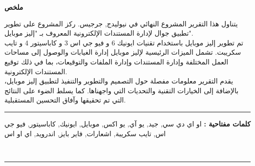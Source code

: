 \begin{center}
  \begin{Arabic}
    \textbf{ملخص}
  \end{Arabic}
\end{center}


\begin{Arabic}
  \par
  يتناول هذا التقرير المشروع النهائي في نيوليدج, جرجيس. ركز المشروع على تطوير تطبيق جوال لإدارة المستندات الإلكترونية المعروف بـ "إليز موبايل".\\
تم تطوير إليز موبايل باستخدام تقنيات ايونيك 6 و فيو جي اس 3 و كاباسيتور 4 و تايب سكريبت.
تشمل الميزات الرئيسية لإليز موبايل إدارة الغيابات والوصول إلى مساحات العمل المختلفة وإدارة المستندات وإدارة الملفات والتوقيعات، بما في ذلك توقيع المستندات الإلكترونية.\\
يقدم التقرير معلومات مفصلة حول التصميم والتطوير والتنفيذ لتطبيق إليز موبايل، بالإضافة إلى الخيارات التقنية والتحديات التي واجهناها. كما يسلط الضوء على النتائج التي تم تحقيقها وآفاق التحسين المستقبلية.
  
\end{Arabic}

\noindent\rule[2pt]{\textwidth}{0.5pt}

\begin{Arabic}

{\textbf{كلمات مفتاحية :}}
او اي دي سي, جيد, يو آي, يو اكس, موبايل, ايونيك, كاباسيتور, فيو جي اس, تايب سكريبة, اشعارات, فاير بايز, اندرويد, اي او اس
\end{Arabic}
\\
\noindent\rule[2pt]{\textwidth}{0.5pt}

\endgroup